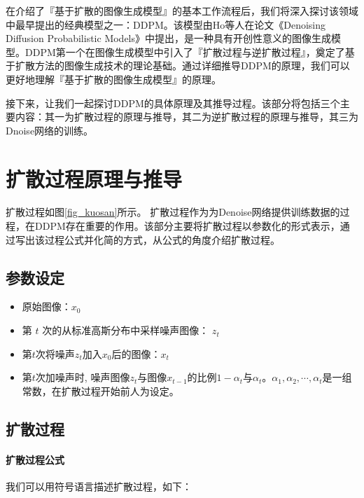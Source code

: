 在介绍了『基于扩散的图像生成模型』的基本工作流程后，我们将深入探讨该领域中最早提出的经典模型之一：DDPM。该模型由Ho等人在论文《Denoising Diffusion Probabilistic Models》\cite{hoDenoisingDiffusionProbabilistic2020a}中提出，是一种具有开创性意义的图像生成模型。DDPM\cite{hoDenoisingDiffusionProbabilistic2020a}第一个在图像生成模型中引入了『扩散过程与逆扩散过程』，奠定了基于扩散方法的图像生成技术的理论基础。通过详细推导DDPM的原理，我们可以更好地理解『基于扩散的图像生成模型』的原理。

接下来，让我们一起探讨DDPM的具体原理及其推导过程。该部分将包括三个主要内容：其一为扩散过程的原理与推导，其二为逆扩散过程的原理与推导，其三为Dnoise网络的训练。

\section{扩散过程原理与推导}

扩散过程如图\ref{fig_kuosan}所示。
扩散过程作为为Denoise网络提供训练数据的过程，在DDPM\cite{hoDenoisingDiffusionProbabilistic2020a}存在重要的作用。该部分主要将扩散过程以参数化的形式表示，通过写出该过程公式并化简的方式，从公式的角度介绍扩散过程。

\subsection{参数设定}

\begin{itemize}
    \item 原始图像：$x_0$
    \item 第 $t$ 次的从标准高斯分布中采样噪声图像： $z_t$
    \item 第$t$次将噪声$z_t$加入$x_0$后的图像：$x_t$
    \item 第$t$次加噪声时, 噪声图像$z_t$与图像$x_{t-1}$的比例$1-\alpha_t$与$\alpha_t$。$\alpha_1,\alpha_2,\cdots,\alpha_t$是一组常数，在扩散过程开始前人为设定。
\end{itemize}

\subsection{扩散过程}

\paragraph{扩散过程公式}

我们可以用符号语言描述扩散过程，如下：

